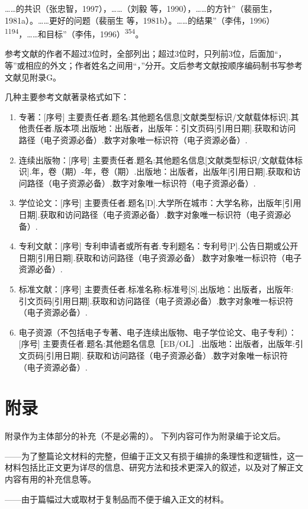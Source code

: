 ……的共识（张忠智，1997），……（刘毅 等，1990），……的方针”（裴丽生，1981a）。……更好的问题（裴丽生 等，1981b）。……的结果”（李伟，1996）\textsuperscript{1194}，……和目标”（李伟，1996）\textsuperscript{354}。

参考文献的作者不超过3位时，全部列出；超过3位时，只列前3位，后面加“，等”或相应的外文；作者姓名之间用“，”分开。文后参考文献按顺序编码制书写参考文献见附录G。

几种主要参考文献著录格式如下：

\begin{enumerate}
    \item 专著：[序号] 主要责任者.题名:其他题名信息[文献类型标识/文献载体标识].其他责任者.版本项.出版地：出版者，出版年：引文页码[引用日期].获取和访问路径（电子资源必备）.数字对象唯一标识符（电子资源必备）.
    \item 连续出版物：[序号] 主要责任者.题名:其他题名信息[文献类型标识/文献载体标识].年，卷（期）-年，卷（期）.出版地：出版者，出版年[引用日期].获取和访问路径（电子资源必备）.数字对象唯一标识符（电子资源必备）.
    \item 学位论文：[序号] 主要责任者.题名[D].大学所在城市：大学名称，出版年[引用日期].获取和访问路径（电子资源必备）.数字对象唯一标识符（电子资源必备）.
    \item 专利文献：[序号] 专利申请者或所有者.专利题名：专利号[P].公告日期或公开日期[引用日期].获取和访问路径（电子资源必备）.数字对象唯一标识符（电子资源必备）.
    \item 标准文献：[序号] 主要责任者.标准名称:标准号[S].出版地：出版者，出版年: 引文页码[引用日期].获取和访问路径（电子资源必备）.数字对象唯一标识符（电子资源必备）.
    \item 电子资源（不包括电子专著、电子连续出版物、电子学位论文、电子专利）：[序号] 主要责任者.题名:其他题名信息［EB/OL］.出版地：出版者，出版年:引文页码[引用日期]. 获取和访问路径（电子资源必备）.数字对象唯一标识符（电子资源必备）.
\end{enumerate}

\section{附录}

附录作为主体部分的补充（不是必需的）。
下列内容可作为附录编于论文后。

——为了整篇论文材料的完整，但编于正文又有损于编排的条理性和逻辑性，这一材料包括比正文更为详尽的信息、研究方法和技术更深入的叙述，以及对了解正文内容有用的补充信息等。

——由于篇幅过大或取材于复制品而不便于编入正文的材料。

